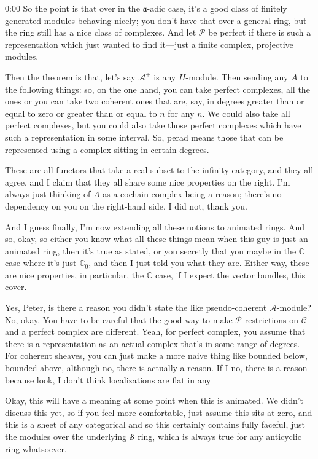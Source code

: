 \begin{unfinished}{0:00}
So the point is that over in the $\mathfrak{a}$-adic case, it's a good class of finitely generated modules behaving nicely; you don't have that over a general ring, but the ring still has a nice class of complexes. And let $\mathcal{P}$ be perfect if there is such a representation which just wanted to find it---just a finite complex, projective modules.

Then the theorem is that, let's say $\mathcal{A}^+$ is any $H$-module. Then sending any $A$ to the following things: so, on the one hand, you can take perfect complexes, all the ones or you can take two coherent ones that are, say, in degrees greater than or equal to zero or greater than or equal to $n$ for any $n$. We could also take all perfect complexes, but you could also take those perfect complexes which have such a representation in some interval. So, perad means those that can be represented using a complex sitting in certain degrees.

These are all functors that take a real subset to the infinity category, and they all agree, and I claim that they all share some nice properties on the right. I'm always just thinking of $A$ as a cochain complex being a reason; there's no dependency on you on the right-hand side. I did not, thank you.

And I guess finally, I'm now extending all these notions to animated rings. And so, okay, so either you know what all these things mean when this guy is just an animated ring, then it's true as stated, or you secretly that you maybe in the $\mathbb{C}$ case where it's just $\mathbb{C}_0$, and then I just told you what they are. Either way, these are nice properties, in particular, the $\mathbb{C}$ case, if I expect the vector bundles, this cover.

Yes, Peter, is there a reason you didn't state the like pseudo-coherent $\mathcal{A}$-module? No, okay. You have to be careful that the good way to make $\mathcal{P}$ restrictions on $\mathcal{C}$ and a perfect complex are different. Yeah, for perfect complex, you assume that there is a representation as an actual complex that's in some range of degrees. For coherent sheaves, you can just make a more naive thing like bounded below, bounded above, although no, there is actually a reason. If I no, there is a reason because look, I don't think localizations are flat in any

Okay, this will have a meaning at some point when this is animated. We didn't discuss this yet, so if you feel more comfortable, just assume this sits at zero, and this is a sheet of any categorical and so this certainly contains fully faceful, just the modules over the underlying $\mathcal{S}$ ring, which is always true for any anticyclic ring whatsoever.


\end{unfinished}
